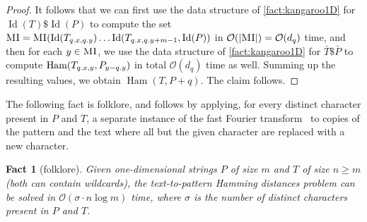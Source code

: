 \documentclass[a4paper,11pt]{article}
\newtheorem{fact}{Fact}[section]
\renewcommand{\O}{\mathcal{O}}
\DeclareMathOperator*{\Ham}{Ham}
\DeclareMathOperator*{\ID}{Id}
\newcommand{\absolute}[1]{\left\lvert#1\right\rvert}
\begin{document}
\begin{proof}
It follows that we can first use the data structure of \cref{fact:kangaroo1D} for  $\ID(T) \$ \ID(P)$ to compute the set $\MI =  \MI(\ID(T_{\x{q}, \y{q}}) \ldots \ID(T_{\x{q}, \y{q}+m-1}, \ID(P))$ in $\O(\absolute{\MI}) = \O(d_q)$ time, and then for each $y \in \textnormal{\textsc{MI}}$, we use the data structure of  \cref{fact:kangaroo1D}  for $\bar{T} \$ \bar{P}$ to compute 
$\Ham(T_{\x{q}, y}, P_{y-\y{q}})$ in total $\O(d_q)$ time as well. Summing up the resulting values, we obtain $\Ham(T, P+q)$. The claim follows. 
\end{proof}

The following fact is folklore, and follows by applying, for every distinct character present in $P$ and $T$, a separate instance of the fast Fourier transform~\cite{FischerP74} to copies of the pattern and the text where all but the given character are replaced with a new character.

\begin{fact}[folklore]\label{fact:sigman1d}
Given one-dimensional strings $P$ of size $m$ and $T$ of size $n \ge m$ (both can contain wildcards), the text-to-pattern Hamming distances problem can be solved in $\O(\sigma \cdot n \log m)$ time, where $\sigma$ is the number of distinct characters present in $P$ and $T$.
\end{fact}
\end{document}
